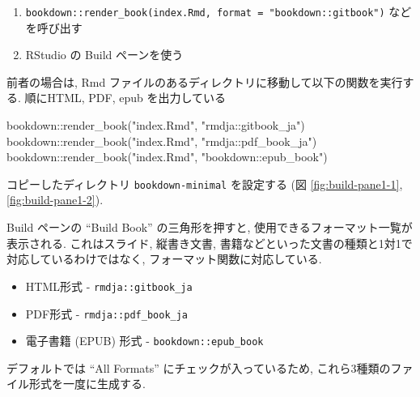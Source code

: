 \documentclass[
]{bxjsbook}
\newenvironment{Shaded}{\begin{snugshade}}{\end{snugshade}}
\newcommand{\FunctionTok}[1]{\textcolor[rgb]{0.00,0.00,0.00}{#1}}
\newcommand{\NormalTok}[1]{#1}
\newcommand{\SpecialCharTok}[1]{\textcolor[rgb]{0.00,0.00,0.00}{#1}}
\newcommand{\StringTok}[1]{\textcolor[rgb]{0.31,0.60,0.02}{#1}}
\providecommand{\tightlist}{%
  \setlength{\itemsep}{0pt}\setlength{\parskip}{0pt}}
\theoremstyle{definition}
\theoremstyle{definition}
\theoremstyle{definition}
\theoremstyle{remark}
\begin{document}
\begin{enumerate}
\def\labelenumi{\arabic{enumi}.}
\tightlist
\item
  \texttt{bookdown::render\_book(\textquotesingle{}index.Rmd\textquotesingle{},\ format\ =\ "bookdown::gitbook")}
  などを呼び出す
\item
  RStudio の Build ペーンを使う
\end{enumerate}

前者の場合は, Rmd
ファイルのあるディレクトリに移動して以下の関数を実行する. 順にHTML, PDF,
epub を出力している

\begin{Shaded}
\begin{Highlighting}[numbers=left,,]
\NormalTok{bookdown}\SpecialCharTok{::}\FunctionTok{render\_book}\NormalTok{(}\StringTok{"index.Rmd"}\NormalTok{, }\StringTok{"rmdja::gitbook\_ja"}\NormalTok{)}
\NormalTok{bookdown}\SpecialCharTok{::}\FunctionTok{render\_book}\NormalTok{(}\StringTok{"index.Rmd"}\NormalTok{, }\StringTok{"rmdja::pdf\_book\_ja"}\NormalTok{)}
\NormalTok{bookdown}\SpecialCharTok{::}\FunctionTok{render\_book}\NormalTok{(}\StringTok{"index.Rmd"}\NormalTok{, }\StringTok{"bookdown::epub\_book"}\NormalTok{)}
\end{Highlighting}
\end{Shaded}

コピーしたディレクトリ \texttt{bookdown-minimal} を設定する (図
\ref{fig:build-pane1-1}, \ref{fig:build-pane1-2}).

Build ペーンの ``Build Book'' の三角形を押すと,
使用できるフォーマット一覧が表示される. これはスライド, 縦書き文書,
書籍などといった文書の種類と1対1で対応しているわけではなく,
フォーマット関数に対応している.

\begin{itemize}
\tightlist
\item
  HTML形式 - \texttt{rmdja::gitbook\_ja}
\item
  PDF形式 - \texttt{rmdja::pdf\_book\_ja}
\item
  電子書籍 (EPUB) 形式 - \texttt{bookdown::epub\_book}
\end{itemize}

デフォルトでは ``All Formats'' にチェックが入っているため,
これら3種類のファイル形式を一度に生成する.
\end{document}
